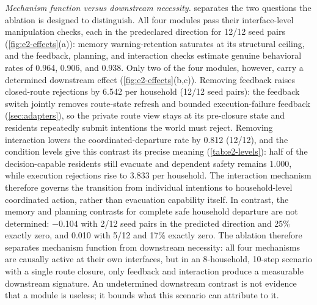 \documentclass[journal]{IEEEtran}
\begin{document}
\emph{Mechanism function versus downstream necessity.}
 separates the two questions the ablation is designed to
distinguish. All four modules pass their interface-level manipulation checks,
each in the predeclared direction for 12/12 seed pairs
(\cref{fig:e2-effects}(a)): memory warning-retention saturates at its structural
ceiling, and the feedback, planning, and interaction checks estimate genuine
behavioral rates of 0.964, 0.906, and 0.938. Only two of the four modules,
however, carry a determined downstream effect (\cref{fig:e2-effects}(b,c)).
Removing feedback raises closed-route rejections by 6.542 per household (12/12
seed pairs): the feedback switch jointly removes route-state refresh and
bounded execution-failure feedback (\cref{sec:adapters}), so the private route
view stays at its pre-closure state and residents repeatedly submit intentions
the world must reject. Removing interaction lowers the coordinated-departure
rate by 0.812 (12/12), and the condition levels give this contrast its precise
meaning (\cref{tab:e2-levels}): half of the decision-capable residents still
evacuate and dependent safety remains 1.000, while execution rejections rise
to 3.833 per household. The interaction mechanism therefore governs the
transition from individual intentions to household-level coordinated action,
rather than evacuation capability itself. In
contrast, the memory and planning contrasts for complete safe household
departure are not determined: $-$0.104 with 2/12 seed pairs in the predicted
direction and 25\% exactly zero, and 0.010 with 5/12 and 17\% exactly zero. The
ablation therefore separates mechanism function from downstream necessity: all
four mechanisms are causally active at their own interfaces, but in an
8-household, 10-step scenario with a single route closure, only feedback and
interaction produce a measurable downstream signature. An undetermined
downstream contrast is not evidence that a module is useless; it bounds what
this scenario can attribute to it.
\end{document}
